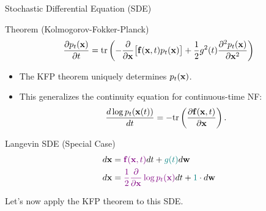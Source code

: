 \documentclass{beamer}
\begin{document}
\begin{frame}{Stochastic Differential Equation (SDE)}
	\begin{block}{Theorem (Kolmogorov-Fokker-Planck)}
		\vspace{-0.2cm}
		\[
			\frac{\partial p_t(\mathbf{x})}{\partial t} = \text{tr}\left( - \frac{\partial}{\partial \mathbf{x}} \bigl[ \mathbf{f}(\mathbf{x}, t) p_t(\mathbf{x})\bigr] + \frac{1}{2} g^2(t) \frac{\partial^2 p_t(\mathbf{x})}{\partial \mathbf{x}^2}\right)
		\]
		\vspace{-0.2cm}
	\end{block}
	\begin{itemize}
		\item The KFP theorem uniquely determines $p_t(\mathbf{x})$.
		\item This generalizes the continuity equation for continuous-time NF:
		\[
			\frac{d \log p_t(\mathbf{x}(t))}{d t} = - \text{tr} \left( \frac{\partial \mathbf{f}(\mathbf{x}, t)}{\partial \mathbf{x}} \right).
		\]
	\end{itemize}
	\vspace{-0.3cm}
	\begin{block}{Langevin SDE (Special Case)}
		\vspace{-0.6cm}
		\begin{align*}
			d\mathbf{x} &= {\color{violet}\mathbf{f}(\mathbf{x}, t)} dt + {\color{teal}g(t)} d \mathbf{w} \\
			d \mathbf{x} &= {\color{violet}\frac{1}{2} \frac{\partial}{\partial \mathbf{x}} \log p_t(\mathbf{x})} d t + {\color{teal} 1 } \cdot d \mathbf{w}
		\end{align*}
		\vspace{-0.4cm}
	\end{block}
	Let's now apply the KFP theorem to this SDE.
\end{frame}
\end{document}
